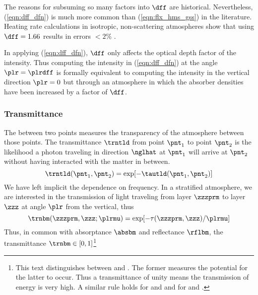 \documentclass[12pt]{article}
\begin{document}
The reasons for subsuming so many factors into $\dff$ are historical.  
Nevertheless, (\ref{eqn:dff_dfn}) is much more common than
(\ref{eqn:flx_hms_gss}) in the literature.
Heating rate calculations in isotropic, non-scattering atmospheres
show that using $\dff = 1.66$ results in errors $< 2\%$
\cite[][p. 221]{GoY89}.  

In applying (\ref{eqn:dff_dfn}), $\dff$ only affects the optical depth
factor of the intensity.
Thus computing the intensity in (\ref{eqn:dff_dfn}) at the angle
$\plr = \plrdff$ is formally equivalent to computing the intensity in
the vertical direction $\plr = 0$ but through an atmosphere in which
the absorber densities have been increased by a factor of $\dff$.

\subsubsection[Transmittance]{Transmittance}\label{sxn:trn}
The  between two points measures the transparency
of the atmosphere between those points.
The transmittance $\trntld$ from point $\pnt_{1}$ to  
point $\pnt_{2}$ is the likelihood a photon traveling in direction
$\nglhat$ at $\pnt_{1}$ will arrive at $\pnt_{2}$ without having
interacted with the matter in between. 
\begin{equation}
\trntld(\pnt_{1},\pnt_{2}) = \exp[-\tautld(\pnt_{1},\pnt_{2})]
\label{eqn:trn_dfn}
\end{equation}
We have left implicit the dependence on frequency.
In a stratified atmosphere, we are interested in the transmission
of light traveling from layer $\zzzprm$ to layer $\zzz$ at angle
$\plr$ from the vertical, thus
\begin{equation}
\trnbm(\zzzprm,\zzz;\plrmu) = \exp[-\tau(\zzzprm,\zzz)/\plrmu]
\label{eqn:trnbm_ppa}
\end{equation}
Thus, in common with absorptance $\absbm$ and reflectance $\rflbm$,
the transmittance $\trnbm \in [0,1]$\footnote{This text distinguishes
between  and . 
The former measures the potential for the latter to occur.
Thus a transmittance of unity means the transmission of energy is very
high.
A similar rule holds for  and 
and for  and .}
\end{document}
